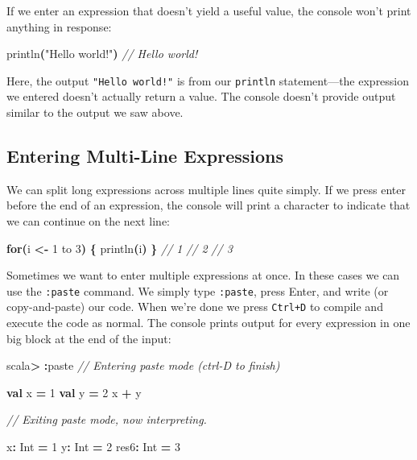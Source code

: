 \documentclass[11pt,a5paper,]{book}
\newenvironment{Shaded}{\begin{snugshade}}{\end{snugshade}}
\newcommand{\BuiltInTok}[1]{#1}
\newcommand{\CommentTok}[1]{\textcolor[rgb]{0.56,0.35,0.01}{\textit{#1}}}
\newcommand{\ControlFlowTok}[1]{\textcolor[rgb]{0.13,0.29,0.53}{\textbf{#1}}}
\newcommand{\DecValTok}[1]{\textcolor[rgb]{0.00,0.00,0.81}{#1}}
\newcommand{\FunctionTok}[1]{\textcolor[rgb]{0.00,0.00,0.00}{#1}}
\newcommand{\KeywordTok}[1]{\textcolor[rgb]{0.13,0.29,0.53}{\textbf{#1}}}
\newcommand{\NormalTok}[1]{#1}
\newcommand{\OperatorTok}[1]{\textcolor[rgb]{0.81,0.36,0.00}{\textbf{#1}}}
\newcommand{\StringTok}[1]{\textcolor[rgb]{0.31,0.60,0.02}{#1}}
\begin{document}
If we enter an expression that doesn't yield a useful value, the console
won't print anything in response:

\begin{Shaded}
\begin{Highlighting}[]
\FunctionTok{println}\OperatorTok{(}\StringTok{"Hello world!"}\OperatorTok{)}
\CommentTok{// Hello world!}
\end{Highlighting}
\end{Shaded}

Here, the output \texttt{"Hello\ world!"} is from our \texttt{println}
statement---the expression we entered doesn't actually return a value.
The console doesn't provide output similar to the output we saw above.

\hypertarget{entering-multi-line-expressions}{%
\subsection{Entering Multi-Line
Expressions}\label{entering-multi-line-expressions}}

We can split long expressions across multiple lines quite simply. If we
press enter before the end of an expression, the console will print a
\texttt{\textbar{}} character to indicate that we can continue on the
next line:

\begin{Shaded}
\begin{Highlighting}[]
\ControlFlowTok{for}\OperatorTok{(}\NormalTok{i }\OperatorTok{\textless{}{-}} \DecValTok{1}\NormalTok{ to }\DecValTok{3}\OperatorTok{)} \OperatorTok{\{}
  \FunctionTok{println}\OperatorTok{(}\NormalTok{i}\OperatorTok{)}
\OperatorTok{\}}
\CommentTok{// 1}
\CommentTok{// 2}
\CommentTok{// 3}
\end{Highlighting}
\end{Shaded}

Sometimes we want to enter multiple expressions at once. In these cases
we can use the \texttt{:paste} command. We simply type \texttt{:paste},
press Enter, and write (or copy-and-paste) our code. When we're done we
press \texttt{Ctrl+D} to compile and execute the code as normal. The
console prints output for every expression in one big block at the end
of the input:

\begin{Shaded}
\begin{Highlighting}[]
\NormalTok{scala}\OperatorTok{\textgreater{}} \OperatorTok{:}\NormalTok{paste}
\CommentTok{// Entering paste mode (ctrl{-}D to finish)}

\KeywordTok{val}\NormalTok{ x }\OperatorTok{=} \DecValTok{1}
\KeywordTok{val}\NormalTok{ y }\OperatorTok{=} \DecValTok{2}
\NormalTok{x }\OperatorTok{+}\NormalTok{ y}

\CommentTok{// Exiting paste mode, now interpreting.}

\NormalTok{x}\OperatorTok{:} \BuiltInTok{Int} \OperatorTok{=} \DecValTok{1}
\NormalTok{y}\OperatorTok{:} \BuiltInTok{Int} \OperatorTok{=} \DecValTok{2}
\NormalTok{res6}\OperatorTok{:} \BuiltInTok{Int} \OperatorTok{=} \DecValTok{3}
\end{Highlighting}
\end{Shaded}
\end{document}
